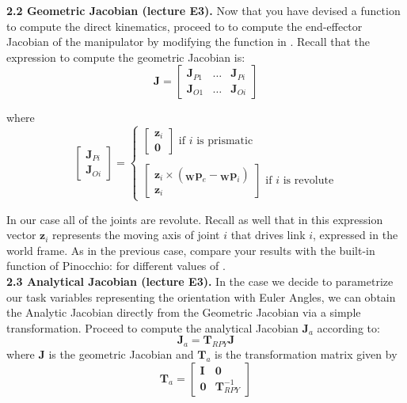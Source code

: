 \documentclass[11pt]{article}
\newcommand{\preposm}[3]{{}_{\mathbf{#2}}{\mathbf{#1}}_{#3}}
\begin{document}
\textbf{2.2 Geometric Jacobian (lecture E3).} Now that you have devised a function to compute the direct kinematics, proceed to to compute the end-effector Jacobian of the manipulator by modifying the function  in . Recall that the expression to compute the geometric Jacobian is:
\begin{equation*}
	\mathbf{J} = \begin{bmatrix}
		\mathbf{J}_{P1} & \dots & \mathbf{J}_{Pi} \\
		\mathbf{J}_{O1} & \dots & \mathbf{J}_{Oi}
	\end{bmatrix}
\end{equation*}

where
\begin{equation*}
	\begin{bmatrix}
		\mathbf{J}_{Pi}\\
		\mathbf{J}_{Oi}
	\end{bmatrix} = 
	\begin{cases}
		\begin{bmatrix}
			\mathbf{z}_i \\
			\mathbf{0}
		\end{bmatrix} \text{   if $i$ is prismatic} \\
		\\
		\begin{bmatrix}
			\mathbf{z}_i \times (\preposm{p}{W}{e} - \preposm{p}{W}{i}) \\
			\mathbf{z}_i
		\end{bmatrix}\text{   if $i$ is revolute}
	\end{cases}
\end{equation*}

In our case all of the joints are revolute. Recall as well that in this expression vector $\mathbf{z}_i$ represents the moving axis of joint $i$ that drives link $i$, expressed in the world frame. As in the previous case, compare your results with the built-in function of Pinocchio:
 for different values of .\\

\textbf{2.3 Analytical Jacobian (lecture E3).} In the case we decide to parametrize our task variables representing the orientation with Euler Angles, we can obtain the Analytic Jacobian directly from the Geometric Jacobian via a simple transformation. Proceed to compute the analytical Jacobian $\mathbf{J}_a$ according to:
%
\begin{equation*}
	\mathbf{J}_a = \mathbf{T}_{RPY} \mathbf{J}
\end{equation*}
where $\mathbf{J}$ is the geometric Jacobian and $\mathbf{T}_a$ is the transformation matrix given by
\begin{equation*}
	\mathbf{T}_a = \begin{bmatrix}
		\mathbf{I} & \mathbf{0} \\
		\mathbf{0} & \mathbf{T}_{RPY}^{-1}
	\end{bmatrix}
\end{equation*}
\end{document}
